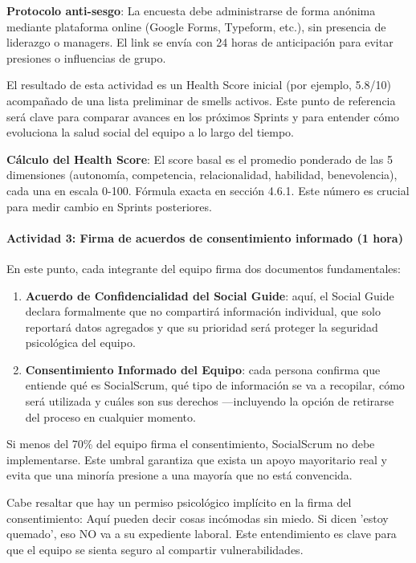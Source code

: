 \textbf{Protocolo anti-sesgo}: La encuesta debe administrarse de forma anónima mediante plataforma online (Google Forms, Typeform, etc.), sin presencia de liderazgo o managers. El link se envía con 24 horas de anticipación para evitar presiones o influencias de grupo.

El resultado de esta actividad es un Health Score inicial (por ejemplo, 5.8/10) acompañado de una lista preliminar de smells activos. Este punto de referencia será clave para comparar avances en los próximos Sprints y para entender cómo evoluciona la salud social del equipo a lo largo del tiempo.

\textbf{Cálculo del Health Score}: El score basal es el promedio ponderado de las 5 dimensiones (autonomía, competencia, relacionalidad, habilidad, benevolencia), cada una en escala 0-100. Fórmula exacta en sección 4.6.1. Este número es crucial para medir cambio en Sprints posteriores.

\paragraph{Actividad 3: Firma de acuerdos de consentimiento informado (1 hora)}

En este punto, cada integrante del equipo firma dos documentos fundamentales:

\begin{enumerate}
    \item \textbf{Acuerdo de Confidencialidad del Social Guide}: aquí, el Social Guide declara formalmente que no compartirá información individual, que solo reportará datos agregados y que su prioridad será proteger la seguridad psicológica del equipo.

    \item \textbf{Consentimiento Informado del Equipo}: cada persona confirma que entiende qué es SocialScrum, qué tipo de información se va a recopilar, cómo será utilizada y cuáles son sus derechos —incluyendo la opción de retirarse del proceso en cualquier momento.

\end{enumerate}

Si menos del 70\% del equipo firma el consentimiento, SocialScrum no debe implementarse. Este umbral garantiza que exista un apoyo mayoritario real y evita que una minoría presione a una mayoría que no está convencida.

Cabe resaltar que hay un permiso psicológico implícito en la firma del consentimiento: Aquí pueden decir cosas incómodas sin miedo. Si dicen 'estoy quemado', eso NO va a su expediente laboral. Este entendimiento es clave para que el equipo se sienta seguro al compartir vulnerabilidades.

